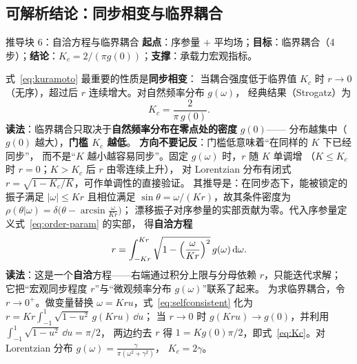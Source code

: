 \subsection{可解析结论：同步相变与临界耦合}
\begin{derivblock}{推导块 6：自洽方程与临界耦合}
\textbf{起点}：序参量 $+$ 平均场；\textbf{目标}：临界耦合（4 步）；\textbf{结论}：$K_c=2/(\pi g(0))$；\textbf{支撑}：承载力宏观指标。



式~\eqref{eq:kuramoto} 最重要的性质是\textbf{同步相变}\cite{dorfler2013,rohden2012}：
当耦合强度低于临界值 $K_c$ 时
$r\to0$（无序），超过后 $r$ 连续增大。对自然频率分布 $g(\omega)$，
经典结果（Strogatz\cite{strogatz2000,acebron2005}）为
\begin{equation}
K_c=\frac{2}{\pi\,g(0)} .
\label{eq:Kc}
\end{equation}
\textbf{读法}：临界耦合只取决于\textbf{自然频率分布在零点处的密度} $g(0)$——
分布越集中（$g(0)$ 越大），\textbf{门槛 $K_c$ 越低}。
\textbf{方向不要记反}：门槛低意味着“在同样的 $K$ 下已经同步”，
而不是“$K$ 越小越容易同步”。固定 $g(\omega)$ 时，$r$ 随 $K$ 单调增
（$K\le K_c$ 时 $r=0$；$K>K_c$ 后 $r$ 由零连续上升），
对 Lorentzian 分布有闭式 $r=\sqrt{1-K_c/K}$，可作单调性的直接验证。
其推导是：在同步态下，能被锁定的振子满足 $|\omega|\le Kr$ 且相位满足
$\sin\theta=\omega/(Kr)$，故其条件密度为
$\rho(\theta|\omega)=\delta\bigl(\theta-\arcsin\frac{\omega}{Kr}\bigr)$；
漂移振子对序参量的实部贡献为零。代入序参量定义式~\eqref{eq:order-param} 的实部，
得\textbf{自洽方程}
\begin{equation}
r=\int_{-Kr}^{Kr}\sqrt{1-\Bigl(\frac{\omega}{Kr}\Bigr)^2}\,g(\omega)\,\mathrm{d}\omega .
\label{eq:selfconsistent}
\end{equation}
\textbf{读法}：这是一个\textbf{自洽}方程——右端通过积分上限与分母依赖 $r$，只能迭代求解；
它把“宏观同步程度 $r$”与“微观频率分布 $g(\omega)$”联系了起来。
为求临界耦合，令 $r\to0^+$。做变量替换 $\omega=Kru$，式~\eqref{eq:selfconsistent} 化为
$r=Kr\int_{-1}^{1}\sqrt{1-u^2}\,g(Kru)\,\dd u$；
当 $r\to0$ 时 $g(Kru)\to g(0)$，并利用 $\int_{-1}^{1}\sqrt{1-u^2}\,\dd u=\pi/2$，
两边约去 $r$ 得 $1=K g(0)\pi/2$，即式~\eqref{eq:Kc}。对 Lorentzian 分布 $g(\omega)=\frac{\gamma}{\pi(\omega^2+\gamma^2)}$，
$K_c=2\gamma$。

\end{derivblock}


